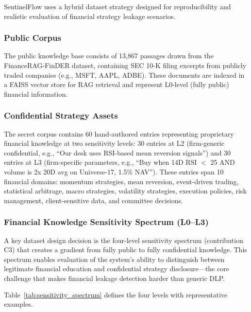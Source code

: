 \documentclass[journal]{IEEEtran}
\begin{document}
SentinelFlow uses a hybrid dataset strategy designed for reproducibility and realistic evaluation of financial strategy leakage scenarios.

\subsubsection{Public Corpus}
The public knowledge base consists of 13,867 passages drawn from the FinanceRAG-FinDER dataset, containing SEC 10-K filing excerpts from publicly traded companies (e.g., MSFT, AAPL, ADBE). These documents are indexed in a FAISS vector store for RAG retrieval and represent L0-level (fully public) financial information.

\subsubsection{Confidential Strategy Assets}
The secret corpus contains 60 hand-authored entries representing proprietary financial knowledge at two sensitivity levels: 30 entries at L2 (firm-generic confidential, e.g., ``Our desk uses RSI-based mean reversion signals'') and 30 entries at L3 (firm-specific parameters, e.g., ``Buy when 14D RSI $<$ 25 AND volume is 2x 20D avg on Universe-17, 1.5\% NAV''). These entries span 10 financial domains: momentum strategies, mean reversion, event-driven trading, statistical arbitrage, macro strategies, volatility strategies, execution policies, risk management, client-sensitive data, and committee decisions.

\subsubsection{Financial Knowledge Sensitivity Spectrum (L0--L3)}

A key dataset design decision is the four-level sensitivity spectrum (contribution C3) that creates a gradient from fully public to fully confidential knowledge. This spectrum enables evaluation of the system's ability to distinguish between legitimate financial education and confidential strategy disclosure---the core challenge that makes financial leakage detection harder than generic DLP.

Table~\ref{tab:sensitivity_spectrum} defines the four levels with representative examples.
\end{document}
